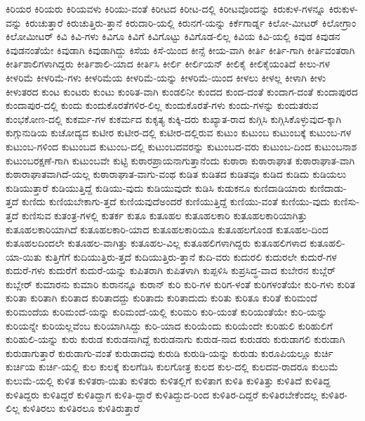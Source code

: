 {ಕಿರಿಯರ
ಕಿರಿಯರು
ಕಿರಿಯವಳು
ಕಿರಿಯು-ವಂತೆ
ಕಿರೀಟದ
ಕಿರೀಟ-ದಲ್ಲಿ
ಕಿರೀಟವೊಂದನ್ನು
ಕಿರುಕುಳ-ಗಳನ್ನೂ
ಕಿರುಕುಳ-ವನ್ನು
ಕಿರುಚುತ್ತಾರೆ
ಕಿರುಚುತ್ತಿರು-ತ್ತಾನೆ
ಕಿರುದಾರಿ-ಯಲ್ಲಿ
ಕಿರುನಗೆ-ಯನ್ನು
ಕಿರ್ಕೆಗಾರ್ಡ್ನ
ಕಿಲೋ-ಮೀಟರ್
ಕಿಲೋಗ್ರಾಂ
ಕಿಲೋಮೀಟರ್
ಕಿವಿ
ಕಿವಿ-ಗಳು
ಕಿವಿಗೂ
ಕಿವಿಗೆ
ಕಿವಿಗೊಟ್ಟು
ಕಿವಿಗೊಡ-ಲಿಲ್ಲ
ಕಿವಿಯ
ಕಿವಿ-ಯಲ್ಲಿ
ಕಿವುಡ
ಕಿವುಡನ
ಕಿವುಡನಂತೆಯೇ
ಕಿವುಡಾಗಿ
ಕಿವುಡಾಗಿದ್ದು
ಕಿಸೆಯ
ಕಿಸೆ-ಯಿಂದ
ಕೀನ್ಸೆ
ಕೀಯ-ವಾಗಿ
ಕೀರ್ತಿ
ಕೀರ್ತಿ-ಗಾಗಿ
ಕೀರ್ತಿವಂತರಾಗಿ
ಕೀರ್ತಿಶಾಲಿಗಳಾಗಿದ್ದರು
ಕೀರ್ತಿಶಾಲಿ-ಯಾದ
ಕೀರ್ತಿಸಿ
ಕೀರ್ಲಿ
ಕೀರ್ಲಿಯನ್
ಕೀಲಿಕೈ
ಕೀಲಿಕೈಯಂತಿದೆ
ಕೀಲು-ಗಳ
ಕೀಳರಿಮೆ
ಕೀಳರಿಮೆ-ಗಳು
ಕೀಳರಿಮೆಯ
ಕೀಳರಿಮೆ-ಯನ್ನು
ಕೀಳರಿಮೆ-ಯಿಂದ
ಕೀಳಲು
ಕೀಳಲ್ಲ
ಕೀಳಾಗಿ
ಕೀಳು
ಕೀಳುತರದ
ಕುಂಟ
ಕುಂಟರು
ಕುಂಟು
ಕುಂಠಿತ-ವಾಗಿ
ಕುಂಡಲಿನೀ
ಕುಂದದ
ಕುಂದ-ದಂತೆ
ಕುಂದಾಗ-ದಂತೆ
ಕುಂದಾಪುರದ
ಕುಂದಾಪುರ-ದಲ್ಲಿ
ಕುಂದು
ಕುಂದುಕೊರತೆಗಳಿರ-ಲಿಲ್ಲ
ಕುಂದುಕೊರತೆ-ಗಳು
ಕುಂದು-ಗಳನ್ನು
ಕುಂದುತರುವ
ಕುಂಭಕೋಣ-ದಲ್ಲಿ
ಕುಕರ್ಮ-ಗಳ
ಕುಕರ್ಮದ
ಕುಕೃತ್ಯ
ಕುಕ್ಕಿ-ದರು
ಕುಖ್ಯಾತ-ರಾದ
ಕುಗ್ಗಿಸಿ
ಕುಗ್ಗಿಸಿಕೊಳ್ಳುವುದ-ಕ್ಕಾಗಿ
ಕುಗ್ಗುನುಡಿಯ
ಕುಚೋದ್ಯದ
ಕುಟೀರ
ಕುಟೀರ-ದಲ್ಲಿ
ಕುಟೀರ-ದಲ್ಲಿರುವ
ಕುಟುಂ
ಕುಟುಂಬ
ಕುಟುಂಬಕ್ಕೆ
ಕುಟುಂಬ-ಗಳ
ಕುಟುಂಬ-ಗಳಿಂದ
ಕುಟುಂಬದ
ಕುಟುಂಬ-ದಲ್ಲಿ
ಕುಟುಂಬದವರನ್ನು
ಕುಟುಂಬದ-ವರು
ಕುಟುಂಬ-ದಿಂದ
ಕುಟುಂಬನಾಶ
ಕುಟುಂಬರಕ್ಷಣೆ-ಗಾಗಿ
ಕುಟುಂಬವೇ
ಕುಟ್ಟಿ
ಕುಠಾರಪ್ರಾಯನಾಗುತ್ತಾನೆಂದು
ಕುಠಾರಾ
ಕುಠಾರಾಘಾತ
ಕುಠಾರಾಘಾತ-ವಾಗಿ
ಕುಠಾರಾಘಾತವಾಗಿದೆ-ಯಲ್ಲ
ಕುಠಾರಾಘಾತ-ವಾಗು-ವಂಥ
ಕುಡಿತ
ಕುಡಿತದ
ಕುಡಿತವೂ
ಕುಡಿದ
ಕುಡಿದು
ಕುಡಿಯಲು
ಕುಡಿಯುತ್ತಾರೆ
ಕುಡಿಯುತ್ತಿದ್ದೆ
ಕುಡಿಯು-ವುದು
ಕುಡಿಯುವುದೇ
ಕುಡಿಸಿ
ಕುಡುಕನೂ
ಕುಣಿದಾಡಿಯಾರು
ಕುಣಿದಾಡು-ತ್ತದೆ
ಕುಣಿದು
ಕುಣಿಯಬೇಕಾಗು-ತ್ತದೆ
ಕುಣಿಯವುದೆಅಂದರೆ
ಕುಣಿಯುತ್ತಿದ್ದೆ
ಕುಣಿಯು-ವಂತೆ
ಕುಣಿಯು-ವುದು
ಕುಣಿಸು-ತ್ತದೆ
ಕುಣಿಸುವ
ಕುತಂತ್ರ-ಗಳಲ್ಲಿ
ಕುತರ್ಕ
ಕುತೂ
ಕುತೂಹಲ
ಕುತೂಹಲಕಾರಿ
ಕುತೂಹಲಕಾರಿಯಾಗಿತ್ತು
ಕುತೂಹಲಕಾರಿಯಾಗಿದೆ
ಕುತೂಹಲಕಾರಿ-ಯಾದ
ಕುತೂಹಲಕಾರಿಯೂ
ಕುತೂಹಲಗೊಂಡ
ಕುತೂಹಲ-ದಿಂದ
ಕುತೂಹಲದಿಂದಲೇ
ಕುತೂಹಲ-ವಾಗಿತ್ತು
ಕುತೂಹಲ-ವಿಲ್ಲ
ಕುತೂಹಲಿಗಳಾಗಿದ್ದರು
ಕುತೂಹಲಿಗಳಾದ
ಕುತೂಹಲಿ-ಯಾ-ಯಿತು
ಕುತ್ತಿಗೆಗೆ
ಕುದಿಯುತ್ತಿರು-ತ್ತದೆ
ಕುದಿಯುತ್ತಿರು-ತ್ತಾನೆ
ಕುದಿ-ವರು
ಕುದುರಲಿ
ಕುದುರಲೇ
ಕುದುರೆ-ಗಳ
ಕುದುರೆ-ಗಳು
ಕುದುರೆಗೆ
ಕುದುರೆ-ಯನ್ನು
ಕುಪಿತರಾಗಿ
ಕುಪಿತಳಾಗಿ
ಕುಪ್ಪಳಿಸಿ
ಕುಪ್ರಸಿದ್ಧ-ವಾದ
ಕುಬೇರನ
ಕುಬ್ಲೆರ್
ಕುಬ್ಲೇರ್
ಕುಮಾರನು
ಕುಮಾರಿ
ಕುರಾನನ್ನೂ
ಕುರಾನ್
ಕುರಿ
ಕುರಿ-ಗಳ
ಕುರಿಗ-ಳಂತೆ
ಕುರಿಗಳಂತೆಯೇ
ಕುರಿ-ಗಳು
ಕುರಿತ
ಕುರಿತಾ
ಕುರಿತಾಗಿ
ಕುರಿತಾದ
ಕುರಿತಾದದ್ದು
ಕುರಿತಾದು
ಕುರಿತಾದುದು
ಕುರಿತು
ಕುರಿತೂ
ಕುರಿತೆ
ಕುರಿಮಂದೆ
ಕುರಿಮಂದೆಯ
ಕುರಿಮಂದೆ-ಯನ್ನು
ಕುರಿಮಂದೆ-ಯಲ್ಲಿ
ಕುರಿಮರಿ
ಕುರಿ-ಯಂತೆ
ಕುರಿಯಂತೆಯೇ
ಕುರಿ-ಯನ್ನು
ಕುರಿಯನ್ನೇ
ಕುರಿಯಲ್ಲವೆಂಬ
ಕುರಿಯಾಗಿಸಿದ್ದು
ಕುರಿ-ಯಾದ
ಕುರಿಯೆಂದು
ಕುರಿಯೆಂದೇ
ಕುರಿಹುಲಿ
ಕುರಿಹುಲಿಗೆ
ಕುರಿಹುಲಿ-ಯನ್ನು
ಕುರು
ಕುರುಡ
ಕುರುಡನಾಗಿದ್ದೆ
ಕುರುಡನಾಗು
ಕುರುಡ-ನಾದ
ಕುರುಡರು
ಕುರುಡಾಗಲಿ
ಕುರುಡಾಗಿ
ಕುರುಡಾಗುತ್ತಾರೆ
ಕುರುಡಾಗು-ವಂತೆ
ಕುರುಡಾದವು
ಕುರುಡಿ
ಕುರುಡಿ-ಯನ್ನು
ಕುರುಡು
ಕುರೂಪಿಯಲ್ಲೂ
ಕುರ್ಚಿ
ಕುರ್ಚಿಯ
ಕುರ್ಚಿ-ಯಲ್ಲಿ
ಕುಲ
ಕುಲಕ್ಕೆ
ಕುಲಗೆಡಿಸಿ
ಕುಲಗೋತ್ರ
ಕುಲದ
ಕುಲ-ದಲ್ಲಿ
ಕುಲದವ-ರಾದರೂ
ಕುಲುಮೆ
ಕುಲುಮೆ-ಯಲ್ಲಿ
ಕುಳಿತ
ಕುಳಿತರಾ-ಯಿತು
ಕುಳಿತರು
ಕುಳಿತಲ್ಲಿಗೆ
ಕುಳಿತಾಗ
ಕುಳಿತಿ
ಕುಳಿತಿತ್ತು
ಕುಳಿತಿದೆ
ಕುಳಿತಿದ್ದ
ಕುಳಿತಿದ್ದರು
ಕುಳಿತಿದ್ದರೆ
ಕುಳಿತಿದ್ದಾಗ
ಕುಳಿತಿ-ದ್ದಾರೆ
ಕುಳಿತಿದ್ದುದ-ರಿಂದ
ಕುಳಿತಿರ-ದಿದ್ದರೆ
ಕುಳಿತಿರಬೇಕೆಂದಲ್ಲ
ಕುಳಿತಿರ-ಲಿಲ್ಲ
ಕುಳಿತಿರಲು
ಕುಳಿತಿರಲೂ
ಕುಳಿತಿರುತ್ತಾರೆ
}
